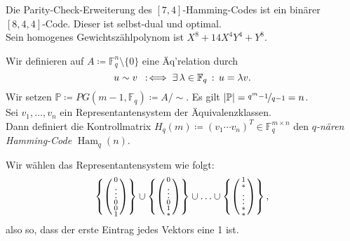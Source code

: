\documentclass{cheat-sheet}
\newcommand{\F}{\mathbb{F}} %
\DeclareMathOperator{\Ham}{Ham} %
\newcommand{\Proj}{\mathbb{P}} %
\begin{document}
\begin{satz}
  Die Parity-Check-Erweiterung des $[7, 4]$-Hamming-Codes ist ein binärer $[8, 4, 4]$-Code.
  Dieser ist selbst-dual und optimal. \\
  Sein homogenes Gewichtszählpolynom ist $X^8 + 14 X^4 Y^4 + Y^8$.
\end{satz}


\begin{konstr}
  Wir definieren auf $A \coloneqq \F_q^n \setminus \{ 0 \}$ eine Äq'relation durch
  \[ u \sim v \coloniff \ex{\lambda \in \F_q} u = \lambda v. \]
  Wir setzen $\Proj \coloneqq PG(m-1, \F_q) \coloneqq A/{\sim}$.
  Es gilt $\abs{\Proj} = \nicefrac{q^m - 1}{q - 1} = n$. \\
  Sei $v_1, \ldots, v_n$ ein Representantensystem der Äquivalenzklassen. \\
  Dann definiert die Kontrollmatrix $H_q(m) \coloneqq (v_1 \cdots v_n)^T \in \F_q^{m \times n}$ den \emph{$q$-nären Hamming-Code} $\Ham_q(n)$.
\end{konstr}

\begin{bem}
  Wir wählen das Representantensystem wie folgt:
  \[
    \left\{ \begin{psmallmatrix} 0 \\ \vdots \\ 0 \\ 0 \\ 1 \end{psmallmatrix} \right\} \cup
    \left\{ \begin{psmallmatrix} 0 \\ \vdots \\ 0 \\ 1 \\ * \end{psmallmatrix} \right\} \cup \ldots \cup
    \left\{ \begin{psmallmatrix} 1 \\ * \\ \vdots \\ * \\ * \end{psmallmatrix} \right\},
  \]
  also so, dass der erste Eintrag jedes Vektors eine 1 ist.
\end{bem}
\end{document}
